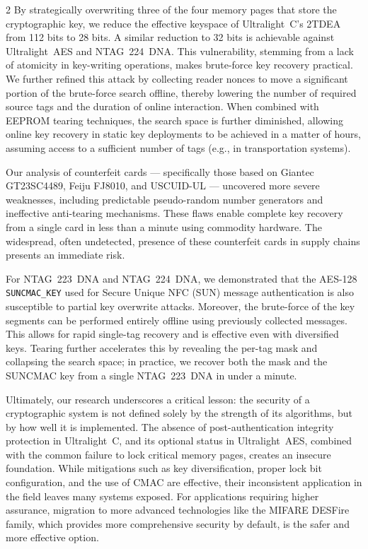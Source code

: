 \documentclass[10pt,letterpaper]{article}
\begin{document}
\begin{multicols}{2}
By strategically overwriting three of the four memory pages that store the cryptographic key, we reduce the effective keyspace of Ultralight~C's 2TDEA from 112 bits to 28 bits. A similar reduction to 32 bits is achievable against Ultralight~AES and NTAG~224~DNA. This vulnerability, stemming from a lack of atomicity in key-writing operations, makes brute-force key recovery practical. We further refined this attack by collecting reader nonces to move a significant portion of the brute-force search offline, thereby lowering the number of required source tags and the duration of online interaction. When combined with EEPROM tearing techniques, the search space is further diminished, allowing online key recovery in static key deployments to be achieved in a matter of hours, assuming access to a sufficient number of tags (e.g., in transportation systems).

Our analysis of counterfeit cards --- specifically those based on Giantec GT23SC4489, Feiju FJ8010, and USCUID-UL --- uncovered more severe weaknesses, including predictable pseudo-random number generators and ineffective anti-tearing mechanisms. These flaws enable complete key recovery from a single card in less than a minute using commodity hardware. The widespread, often undetected, presence of these counterfeit cards in supply chains presents an immediate risk.

For NTAG~223~DNA and NTAG~224~DNA, we demonstrated that the AES-128 \texttt{SUNCMAC\_KEY} used for Secure Unique NFC (SUN) message authentication is also susceptible to partial key overwrite attacks. 
Moreover, the brute-force of the key segments can be performed entirely offline using previously collected messages. This allows for rapid single-tag recovery and is effective even with diversified keys.
Tearing further accelerates this by revealing the per-tag mask and collapsing the search space; in practice, we recover both the mask and the SUNCMAC key from a single NTAG~223~DNA in under a minute.

Ultimately, our research underscores a critical lesson: the security of a cryptographic system is not defined solely by the strength of its algorithms, but by how well it is implemented. The absence of post-authentication integrity protection in Ultralight~C, and its optional status in Ultralight~AES, combined with the common failure to lock critical memory pages, creates an insecure foundation. While mitigations such as key diversification, proper lock bit configuration, and the use of CMAC are effective, their inconsistent application in the field leaves many systems exposed. For applications requiring higher assurance, migration to more advanced technologies like the MIFARE DESFire family, which provides more comprehensive security by default, is the safer and more effective option.


\end{multicols}
\end{document}
